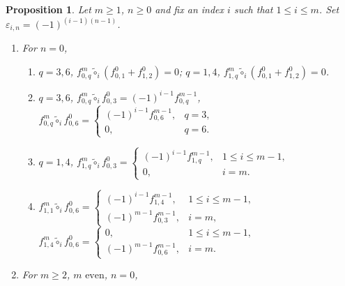 \documentclass[10pt, reqno]{amsart}
\newtheorem{prop}[theorem]{Proposition}
\theoremstyle{definition}
\theoremstyle{remark}
\numberwithin{equation}{section}
\begin{document}
\begin{prop}\label{prop: circle product}
    Let \(m \ge  1\), \(n \ge  0\) and fix an index \(i\) such that \(1 \le i \le m\).  Set
$\varepsilon_{i,n}=(-1)^{(i-1)(n-1)}$.
    \begin{enumerate}
        \item For \(n = 0\), \begin{enumerate}
            \item \(q=3,6\), $f_{0,q}^m \tilde{\circ}_i (f_{0,1}^0 + f_{1,2}^0) =0$; $q=1,4$, $f_{1,q}^m \tilde{\circ}_i (f_{0,1}^0 + f_{1,2}^0) =0$.
            \item \(q=3,6\), $f_{0,q}^m \tilde{\circ}_i f_{0,3}^0 = (-1)^{i-1} f_{0,q}^{m-1}$, $f_{0,q}^m \tilde{\circ}_i f_{0,6}^0 = \begin{cases}
                (-1)^{i-1} f_{0,6}^{m-1}, & q=3, \\
                0, &q=6.
            \end{cases} $
             \item \(q=1,4\), $f_{1,q}^m \tilde{\circ}_i f_{0,3}^0 =\begin{cases}
                (-1)^{i-1} f_{1,q}^{m-1}, & 1 \le i \le m-1,\\
                0, & i=m.
            \end{cases}$
            \item $f_{1,1}^m \tilde{\circ}_i f_{0,6}^0 =\begin{cases}
                (-1)^{i-1}f_{1,4}^{m-1}, & 1 \le i \le m-1,\\
                (-1)^{m-1} f_{0,3}^{m-1}, & i=m,
            \end{cases}$   
             $f_{1,4}^m \tilde{\circ}_i f_{0,6}^0 =\begin{cases}
               0, & 1\le i\le m-1,\\
                (-1)^{m-1} f_{0,6}^{m-1}, & i=m.
             \end{cases}$ 
        \end{enumerate}
        \item For \(m\ge 2\), \(m \text{ even}\), \(n = 0\), 
\end{enumerate}
\end{prop}
\end{document}
